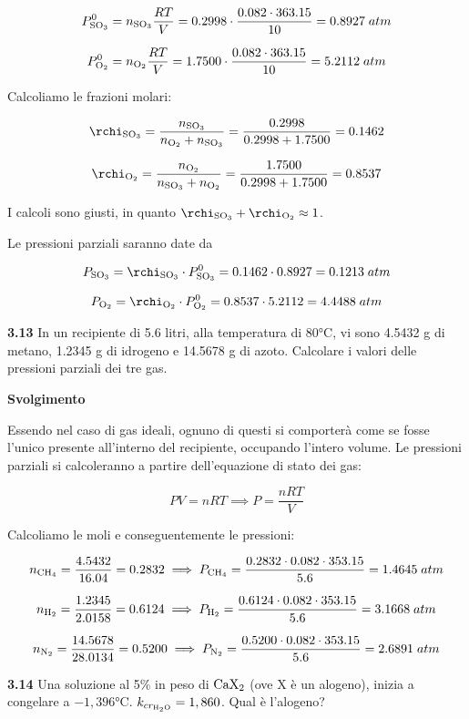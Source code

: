 $$P^0_{\rm SO_3}=n_{\rm SO_3} \displaystyle \frac{RT}{V}
=0.2998 \cdot \frac{0.082 \cdot 363.15}{10}
=0.8927\;atm$$

$$P^0_{\rm O_2}=n_{\rm O_2} \displaystyle \frac{RT}{V}
=1.7500 \cdot \frac{0.082 \cdot 363.15}{10}
=5.2112\;atm$$

Calcoliamo le frazioni molari:

$$\rchi_{\rm SO_3}=\frac{n_{\rm SO_3}}{n_{\rm O_2} + n_{\rm SO_3}}=\frac{0.2998}{0.2998 + 1.7500}=0.1462$$

$$\rchi_{\rm O_2}=\frac{n_{\rm O_2}}{n_{\rm SO_3} + n_{\rm O_2}}=\frac{1.7500}{0.2998 + 1.7500}=0.8537$$

I calcoli sono giusti, in quanto $\rchi_{\rm SO_3} + \rchi_{\rm O_2} \approx 1$.

Le pressioni parziali saranno date da

$$P_{\rm SO_3}=\rchi_{\rm SO_3} \cdot P^0_{\rm SO_3}
=0.1462 \cdot 0.8927=0.1213\;atm$$

$$P_{\rm O_2}=\rchi_{\rm O_2} \cdot P^0_{\rm O_2}
=0.8537 \cdot 5.2112=4.4488\;atm$$

\vspace{0.2cm}\textbf{3.13} In un recipiente di 5.6 litri, alla temperatura di 80°C, vi sono 4.5432 g di metano, 1.2345 g di idrogeno e 14.5678 g di azoto. Calcolare i valori delle pressioni parziali dei tre gas. 

\vspace{0.2cm}\large\textbf{Svolgimento}\normalsize

\vspace{0.2cm}Essendo nel caso di gas ideali, ognuno di questi si comporterà come se fosse l'unico presente all'interno del recipiente, occupando l'intero volume. Le pressioni parziali si calcoleranno a partire dell'equazione di stato dei gas:

$$PV=nRT
\implies
P=\frac{nRT}{V}$$

Calcoliamo le moli e conseguentemente le pressioni:

$$n_{\rm CH_4}=\frac{4.5432}{16.04}=0.2832
\implies
P_{\rm CH_4}=\frac{0.2832 \cdot 0.082 \cdot 353.15}{5.6}=1.4645\;atm$$

$$n_{\rm H_2}=\frac{1.2345}{2.0158}=0.6124
\implies
P_{\rm H_2}=\frac{0.6124 \cdot 0.082 \cdot 353.15}{5.6}=3.1668\;atm$$

$$n_{\rm N_2}=\frac{14.5678}{28.0134}=0.5200
\implies
P_{\rm N_2}=\frac{0.5200 \cdot 0.082 \cdot 353.15}{5.6}=2.6891\;atm$$

\vspace{0.2cm}\textbf{3.14} Una soluzione al 5\% in peso di $\rm CaX_2$ (ove X è un alogeno), inizia a congelare a $-1,396$°C. $k_{cr_{\rm H_2O}} = 1,860$. Qual è l'alogeno? 

